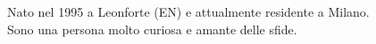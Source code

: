 \documentclass[9pt]{developercv} %
\begin{document}
\vspace{0.5cm}



\begin{figure}[!htb]
    \centering
    \begin{minipage}{0.5\textwidth} %
    \vspace{0.3cm}
	\vspace{-\baselineskip} %
	
	Nato nel 1995 a Leonforte (EN) e attualmente residente a Milano.\\
	Sono una persona molto curiosa e amante delle sfide.\\

	\end{minipage}
	\hfill %
	\begin{minipage}{0.4\textwidth} %
		\centering
	\end{minipage}
\end{figure}

\vspace{0.5cm}






\end{document}
